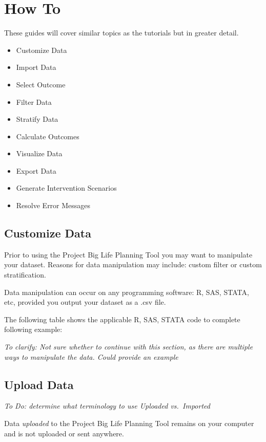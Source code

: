 \documentclass[]{book}
\providecommand{\tightlist}{%
  \setlength{\itemsep}{0pt}\setlength{\parskip}{0pt}}
\begin{document}
\chapter{How To}\label{howto}

These guides will cover similar topics as the tutorials but in greater
detail.

\begin{itemize}
\tightlist
\item
  Customize Data
\item
  Import Data
\item
  Select Outcome
\item
  Filter Data
\item
  Stratify Data
\item
  Calculate Outcomes
\item
  Visualize Data
\item
  Export Data
\item
  Generate Intervention Scenarios
\item
  Resolve Error Messages
\end{itemize}

\section{Customize Data}\label{customize-data}

Prior to using the Project Big Life Planning Tool you may want to
manipulate your dataset. Reasons for data manipulation may include:
custom filter or custom stratification.

Data manipulation can occur on any programming software: R, SAS, STATA,
etc, provided you output your dataset as a .csv file.

The following table shows the applicable R, SAS, STATA code to complete
following example:

\emph{To clarify: Not sure whether to continue with this section, as
there are multiple ways to manipulate the data. Could provide an
example}

\section{Upload Data}\label{upload-data}

\emph{To Do: determine what terminology to use Uploaded vs.~Imported}

Data \emph{uploaded} to the Project Big Life Planning Tool remains on
your computer and is not uploaded or sent anywhere.
\end{document}
